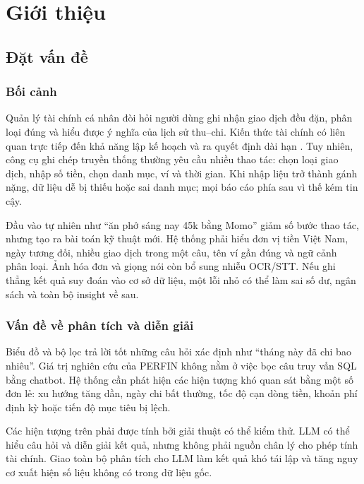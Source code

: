 \chapter{Giới thiệu}
\label{chap:introduction}

\section{Đặt vấn đề}

\subsection{Bối cảnh}

Quản lý tài chính cá nhân đòi hỏi người dùng ghi nhận giao dịch đều đặn, phân loại đúng và hiểu được ý nghĩa của lịch sử thu--chi. Kiến thức tài chính có liên quan trực tiếp đến khả năng lập kế hoạch và ra quyết định dài hạn \cite{lusardi2014}. Tuy nhiên, công cụ ghi chép truyền thống thường yêu cầu nhiều thao tác: chọn loại giao dịch, nhập số tiền, chọn danh mục, ví và thời gian. Khi nhập liệu trở thành gánh nặng, dữ liệu dễ bị thiếu hoặc sai danh mục; mọi báo cáo phía sau vì thế kém tin cậy.

Đầu vào tự nhiên như ``ăn phở sáng nay 45k bằng Momo'' giảm số bước thao tác, nhưng tạo ra bài toán kỹ thuật mới. Hệ thống phải hiểu đơn vị tiền Việt Nam, ngày tương đối, nhiều giao dịch trong một câu, tên ví gần đúng và ngữ cảnh phân loại. Ảnh hóa đơn và giọng nói còn bổ sung nhiễu OCR/STT. Nếu ghi thẳng kết quả suy đoán vào cơ sở dữ liệu, một lỗi nhỏ có thể làm sai số dư, ngân sách và toàn bộ insight về sau.

\subsection{Vấn đề về phân tích và diễn giải}

Biểu đồ và bộ lọc trả lời tốt những câu hỏi xác định như ``tháng này đã chi bao nhiêu''. Giá trị nghiên cứu của PERFIN không nằm ở việc bọc câu truy vấn SQL bằng chatbot. Hệ thống cần phát hiện các hiện tượng khó quan sát bằng một số đơn lẻ: xu hướng tăng dần, ngày chi bất thường, tốc độ cạn dòng tiền, khoản phí định kỳ hoặc tiến độ mục tiêu bị lệch.

Các hiện tượng trên phải được tính bởi giải thuật có thể kiểm thử. LLM có thể hiểu câu hỏi và diễn giải kết quả, nhưng không phải nguồn chân lý cho phép tính tài chính. Giao toàn bộ phân tích cho LLM làm kết quả khó tái lập và tăng nguy cơ xuất hiện số liệu không có trong dữ liệu gốc.

